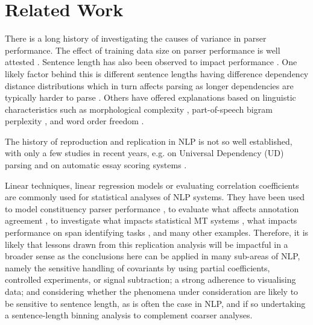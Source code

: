 \documentclass[11pt,a4paper]{article}
\begin{document}
\section{Related Work}
There is a long history of investigating the causes of variance in parser performance. The effect of training data size on parser performance is well attested \cite{sagae-etal-2008-evaluating,falenska-cetinoglu-2017-lexicalized,strzyz-etal-2019-viable,dehouck-etal-2020-efficient}. Sentence length has also been observed to impact performance \cite{mcdonald-nivre-2011-analyzing}. One likely factor behind this is different sentence lengths having difference dependency distance distributions \cite{ferrer-i-cancho2014the} which in turn affects parsing
as longer dependencies are typically harder to parse \cite{anderson-gomez-rodriguez-2020-inherent,falenska-etal-2020-integrating}. Others have offered explanations based on linguistic characteristics such as morphological complexity \cite{dehouck-denis-2018-framework,coltekin-2020-verification}, part-of-speech bigram perplexity \cite{berdicevskis2018using}, and word order freedom \cite{gulordava-merlo-2016-multi}.

The history of reproduction and replication in NLP is not so well established, with only a few studies in recent years, e.g. on Universal Dependency (UD) parsing \cite{coltekin-2020-verification} and on automatic essay scoring systems \cite{huber-coltekin-2020-reproduction}.

Linear techniques, linear regression models or evaluating correlation coefficients are commonly used for statistical analyses of NLP systems. They have been used to model constituency parser performance \cite{ravi-etal-2008-automatic}, to evaluate what affects annotation agreement \cite{bayerl-paul-2011-determines}, to investigate what impacts statistical MT systems \cite{guzman-vogel-2012-understanding}, what impacts performance on span identifying tasks \cite{papay-etal-2020-dissecting}, and many other examples. Therefore, it is likely that lessons drawn from this replication analysis will be impactful in a broader sense as the conclusions here can be applied in many sub-areas of NLP, namely the sensitive handling of covariants by using partial coefficients, controlled experiments, or signal subtraction; a strong adherence to visualising data; and considering whether the phenomena under consideration are likely to be sensitive to sentence length, as is often the case in NLP, and if so undertaking a sentence-length binning analysis to complement coarser analyses.
\end{document}
